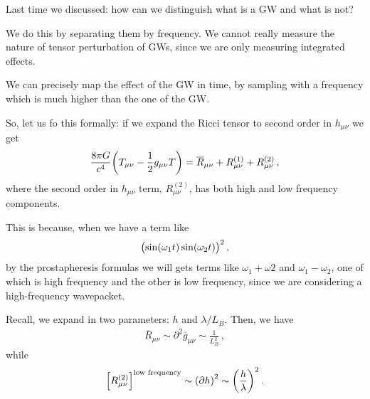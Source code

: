 \documentclass[main.tex]{subfiles}
\begin{document}

Last time we discussed: how can we distinguish what is a GW and what is not? 

We do this by separating them by frequency. 
We cannot really measure the nature of tensor perturbation of GWs, since we are only measuring integrated effects. 

We can precisely map the effect of the GW in time, by sampling with a frequency which is much higher than the one of the GW. 

So, let us fo this formally: if we expand the Ricci tensor to second order in \(h_{\mu \nu }\) we get 
%
\begin{align}
\frac{8 \pi G}{c^{4}} \qty(T_{\mu \nu } - \frac{1}{2} g_{\mu \nu }T)
= \overline{R}_{\mu \nu } 
+ R^{(1)}_{\mu \nu } 
+ R^{(2)}_{\mu \nu } 
\,,
\end{align}
%
where the second order in \(h_{\mu \nu }\) term, \(R^{(2)}_{\mu \nu }\), has both high and low frequency components. 

This is because, when we have a term like 
%
\begin{align}
\qty(\sin(\omega_{1} t)\sin(\omega_2 t))^2
\,,
\end{align}
%
by the prostapheresis formulas we will gets terms like \(\omega_1 + \omega 2 \) and \(\omega_1 - \omega_2 \), one of which is high frequency and the other is low frequency, since we are considering a high-frequency wavepacket.

Recall, we expand in two parameters: \(h\) and \(\lambda / L_B\). Then, we have 
%
\begin{align}
\overline{R}_{\mu \nu } \sim \partial^2 \overline{g}_{\mu \nu } \sim \frac{1}{L_B^2} 
\,,
\end{align}
%
while 
%
\begin{align}
\qty[R^{(2)}_{\mu \nu }]^{\text{low frequency}} \sim \qty(\partial h)^2
 \sim \qty(\frac{h}{\lambda })^2
\,.
\end{align}
\end{document}
